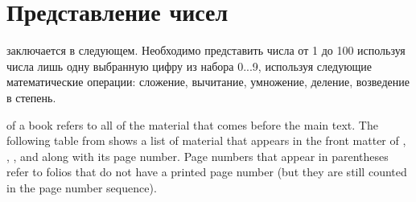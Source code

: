\chapter{Представление чисел}
\label{ch:need_to_think}

 заключается в следующем. Необходимо представить числа от 1 до 100 используя числа лишь одну выбранную цифру из набора 0...9, используя следующие математические операции: сложение, вычитание, умножение, деление, возведение в степень. 

 of a book refers to all of the material that
comes before the main text.  The following table from shows a list of
material that appears in the front matter of \VDQI, \EI, \VE, and \BE
along with its page number.  Page numbers that appear in parentheses refer
to folios that do not have a printed page number (but they are still
counted in the page number sequence).
